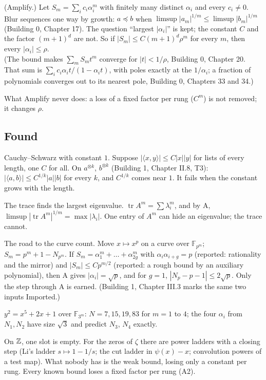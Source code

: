 \begin{lines}
\item[\lab{A}] [proved] (Amplify.) Let $S_m = \sum_i c_i \alpha_i^m$ with finitely many distinct $\alpha_i$ and every $c_i \ne 0$. Blur sequences one way by growth: $a \preceq b$ when $\limsup |a_m|^{1/m} \le \limsup |b_m|^{1/m}$ (Building 0, Chapter 17). The question ``largest $|\alpha_i|$'' is kept; the constant $C$ and the factor $(m+1)^d$ are not. So if $|S_m| \le C(m + 1)^d \rho^m$ for every $m$, then every $|\alpha_i| \le \rho$. \\
(The bound makes $\sum_m S_m t^m$ converge for $|t| < 1/\rho$, Building 0, Chapter 20. That sum is $\sum_i c_i \alpha_i t/(1 - \alpha_i t)$, with poles exactly at the $1/\alpha_i$; a fraction of polynomials converges out to its nearest pole, Building 0, Chapters 33 and 34.)
\item[\lab{A2}] [proved] What Amplify never does: a loss of a fixed factor per rung ($C^m$) is not removed; it changes $\rho$.
\end{lines}

\subsection*{Found}

\begin{lines}
\item[\lab{F1}] [proved] Cauchy--Schwarz with constant $1$. Suppose $|\langle x, y \rangle| \le C|x||y|$ for lists of every length, one $C$ for all. On $a^{\otimes k}$, $b^{\otimes k}$ (Building 1, Chapter II.8, T3): $|\langle a, b\rangle| \le C^{1/k}|a||b|$ for every $k$, and $C^{1/k}$ comes near $1$. It fails when the constant grows with the length.
\item[\lab{F2}] [proved] The trace finds the largest eigenvalue. $\operatorname{tr} A^m = \sum \lambda_i^m$, and by A, $\limsup |\operatorname{tr} A^m|^{1/m} = \max|\lambda_i|$. One entry of $A^m$ can hide an eigenvalue; the trace cannot.
\item[\lab{F3}] [reported, two inputs] The road to the curve count. Move $x \mapsto x^p$ on a curve over $\mathbb{F}_{p^m}$; $S_m = p^m + 1 - N_{p^m}$. If $S_m = \alpha_1^m + \dots + \alpha_{2g}^m$ with $\alpha_i\alpha_{i+g} = p$ (reported: rationality and the mirror) and $|S_m| \le Cp^{m/2}$ (reported: a rough bound by an auxiliary polynomial), then A gives $|\alpha_i| = \sqrt p$, and for $g = 1$, $|N_p - p - 1| \le 2\sqrt p$. Only the step through A is earned. (Building 1, Chapter III.3 marks the same two inputs Imported.)
\item[\lab{F4}] [machine] $y^2 = x^5 + 2x + 1$ over $\mathbb{F}_{3^m}$: $N = 7, 15, 19, 83$ for $m = 1$ to $4$; the four $\alpha_i$ from $N_1, N_2$ have size $\sqrt 3$ and predict $N_3$, $N_4$ exactly.
\item[\lab{F5}] [reported] On $\mathbb{Z}$, one slot is empty. For the zeros of $\zeta$ there are power ladders with a closing step (Li's ladder $s \mapsto 1 - 1/s$; the cut ladder in $\psi(x) - x$; convolution powers of a test map). What nobody has is the weak bound, losing only a constant per rung. Every known bound loses a fixed factor per rung (A2).
\end{lines}


